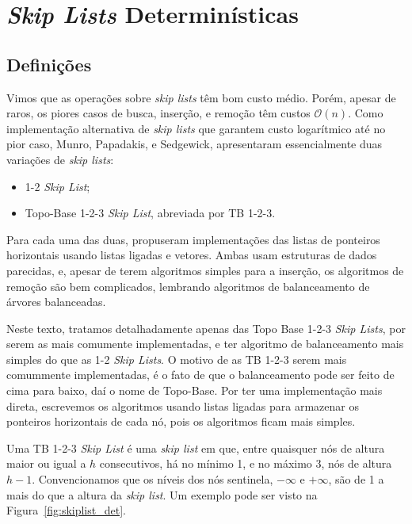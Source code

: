 \documentclass[paper=a4, fontsize=11pt]{scrartcl} %
\numberwithin{equation}{section}
\numberwithin{figure}{section}
\numberwithin{table}{section}
\numberwithin{definition}{section}
\numberwithin{theorem}{section}
\numberwithin{property}{section}
\numberwithin{proposition}{section}
\newcommand{\cO}{\ensuremath{\mathcal{O}}}
\newcommand{\SL}{\textit{Skip List}\xspace}
\newcommand{\SLs}{\textit{Skip Lists}\xspace}
\newcommand{\sls}{\textit{skip lists}\xspace}
\renewcommand{\sl}{\textit{skip list}\xspace}
\begin{document}
\section{\SLs Determinísticas}
\subsection{Definições}

Vimos que as operações sobre \sls têm bom custo médio. Porém, apesar de raros, os piores casos de busca,
inserção, e remoção têm custos $\cO(n)$. Como implementação alternativa de \sls que garantem
custo logarítmico até no pior caso, Munro, Papadakis, e Sedgewick, apresentaram essencialmente duas variações 
de \sls \cite{munro1992deterministic}:
\begin{itemize}
  \item 1-2 \SL;
  \item Topo-Base 1-2-3 \SL, abreviada por TB 1-2-3.
\end{itemize}

Para cada uma das duas, propuseram implementações das listas de ponteiros horizontais usando listas
ligadas e vetores. Ambas 
usam estruturas de dados parecidas, e, apesar de terem algoritmos simples para a inserção, os 
algoritmos de remoção são bem complicados, lembrando algoritmos de balanceamento de árvores balanceadas.


Neste texto, tratamos detalhadamente apenas das Topo Base 1-2-3 \SLs, por serem as mais comumente
implementadas, e ter algoritmo de balanceamento mais simples do que as 1-2 \SLs.
O motivo de as TB 1-2-3 serem mais comummente implementadas, é o fato de que
o balanceamento pode ser feito de cima para baixo, daí o nome de Topo-Base. Por ter uma implementação
mais direta, escrevemos os algoritmos usando listas ligadas para armazenar os ponteiros horizontais 
de cada nó,  pois os algoritmos ficam mais simples.

Uma TB 1-2-3 \SL é uma \sl em que, entre quaisquer nós de altura maior ou igual a $h$ consecutivos, 
há no mínimo 1, e no máximo 3, nós de altura $h - 1$. Convencionamos que os níveis dos nós 
sentinela, $-\infty$ e $+\infty$,
são de 1 a mais do que a altura da \sl. Um exemplo pode ser visto na Figura~\ref{fig:skiplist_det}.
\end{document}

